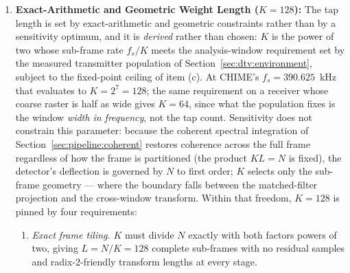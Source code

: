 \begin{enumerate}
    \item \textbf{Exact-Arithmetic and Geometric Weight Length ($K = 128$):} The tap length is set by exact-arithmetic and geometric constraints rather than by a sensitivity optimum, and it is \emph{derived} rather than chosen: $K$ is the power of two whose sub-frame rate $f_s/K$ meets the analysis-window requirement set by the measured transmitter population of Section~\ref{sec:dtv:environment}, subject to the fixed-point ceiling of item (c). At CHIME's $f_s = 390.625$~kHz that evaluates to $K = 2^7 = 128$; the same requirement on a receiver whose coarse raster is half as wide gives $K = 64$, since what the population fixes is the window \emph{width in frequency}, not the tap count. Sensitivity does not constrain this parameter: because the coherent spectral integration of Section~\ref{sec:pipeline:coherent} restores coherence across the full frame regardless of how the frame is partitioned (the product $KL = N$ is fixed), the detector's deflection is governed by $N$ to first order; $K$ selects only the sub-frame geometry --- where the boundary falls between the matched-filter projection and the cross-window transform. Within that freedom, $K = 128$ is pinned by four requirements:
    \begin{enumerate}
        \item \emph{Exact frame tiling.} $K$ must divide $N$ exactly with both factors powers of two, giving $L = N/K = 128$ complete sub-frames with no residual samples and radix-2-friendly transform lengths at every stage.

\end{enumerate}
\end{enumerate}
